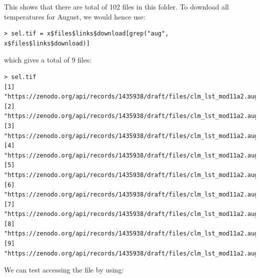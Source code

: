 \documentclass[
  graybox,natbib,nospthms]{svmono}
\begin{document}
This shows that there are total of 102 files in this folder. To download all temperatures for August,
we would hence use:

\begin{verbatim}
> sel.tif = x$files$links$download[grep("aug", x$files$links$download)]
\end{verbatim}

which gives a total of 9 files:

\begin{verbatim}
> sel.tif
[1] "https://zenodo.org/api/records/1435938/draft/files/clm_lst_mod11a2.aug.day_u.975_1km_s0..0cm_2000..2017_v1.0.tif/content"  
[2] "https://zenodo.org/api/records/1435938/draft/files/clm_lst_mod11a2.aug.day_l.025_1km_s0..0cm_2000..2017_v1.0.tif/content"  
[3] "https://zenodo.org/api/records/1435938/draft/files/clm_lst_mod11a2.aug.day_m_1km_s0..0cm_2000..2017_v1.0.tif/content"      
[4] "https://zenodo.org/api/records/1435938/draft/files/clm_lst_mod11a2.aug.daynight_m_1km_s0..0cm_2000..2017_v1.0.tif/content" 
[5] "https://zenodo.org/api/records/1435938/draft/files/clm_lst_mod11a2.aug.day_sd_1km.png/content"                             
[6] "https://zenodo.org/api/records/1435938/draft/files/clm_lst_mod11a2.aug.day_sd_1km_s0..0cm_2000..2017_v1.0.tif/content"     
[7] "https://zenodo.org/api/records/1435938/draft/files/clm_lst_mod11a2.aug.night_l.025_1km_s0..0cm_2000..2017_v1.0.tif/content"
[8] "https://zenodo.org/api/records/1435938/draft/files/clm_lst_mod11a2.aug.night_u.975_1km_s0..0cm_2000..2017_v1.0.tif/content"
[9] "https://zenodo.org/api/records/1435938/draft/files/clm_lst_mod11a2.aug.night_m_1km_s0..0cm_2000..2017_v1.0.tif/content" 
\end{verbatim}

We can test accessing the file by using:
\end{document}
